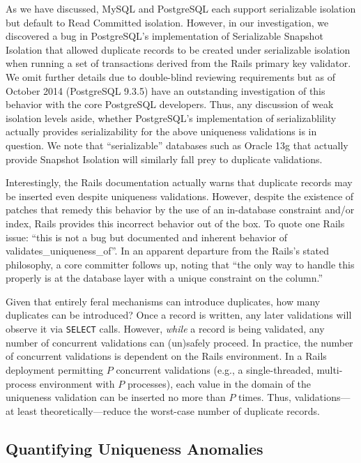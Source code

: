 As we have discussed, MySQL and PostgreSQL each support serializable
isolation but default to Read Committed isolation. However, in our
investigation, we discovered a bug in PostgreSQL's implementation of
Serializable Snapshot Isolation that allowed duplicate records to be
created under serializable isolation when running a set of
transactions derived from the Rails primary key validator. We omit
further details due to double-blind reviewing requirements but as of
October 2014 (PostgreSQL 9.3.5) have an outstanding investigation of
this behavior with the core PostgreSQL developers. Thus, any
discussion of weak isolation levels aside, whether PostgreSQL's
implementation of serializablility actually provides serializability
for the above uniqueness validations is in question. We note
that ``serializable'' databases such as Oracle 13g that actually
provide Snapshot Isolation will similarly fall prey to duplicate
validations.

Interestingly, the Rails documentation actually warns that duplicate
records may be inserted even despite uniqueness validations. However,
despite the existence of patches that remedy this behavior by the use
of an in-database constraint and/or index, Rails provides this
incorrect behavior out of the box. To quote one Rails issue: ``this is
not a bug but documented and inherent behavior of
validates\_uniqueness\_of''. In an apparent departure from the Rails's
stated philosophy, a core committer follows up, noting that ``the only
way to handle this properly is at the database layer with a unique
constraint on the column.''

Given that entirely feral mechanisms can introduce duplicates, how
many duplicates can be introduced? Once a record is written, any later
validations will observe it via \texttt{SELECT} calls. However,
\textit{while} a record is being validated, any number of concurrent
validations can (un)safely proceed. In practice, the number of
concurrent validations is dependent on the Rails environment. In a
Rails deployment permitting $P$ concurrent validations (e.g., a
single-threaded, multi-process environment with $P$ processes), each
value in the domain of the uniqueness validation can be inserted no
more than $P$ times. Thus, validations---at least
theoretically---reduce the worst-case number of duplicate records.

\subsection{Quantifying Uniqueness Anomalies}

